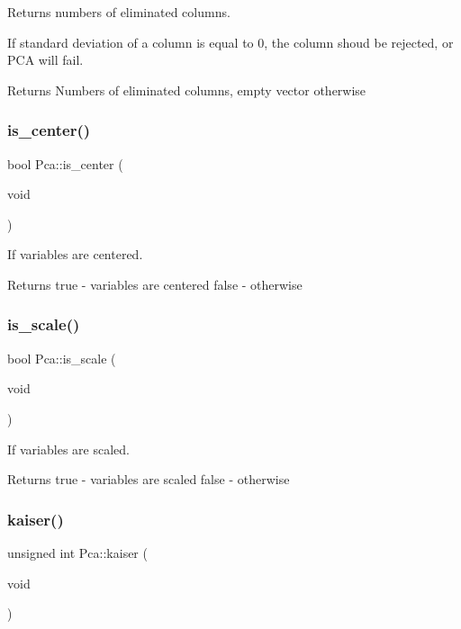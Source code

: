 Returns numbers of eliminated columns. 

If standard deviation of a column is equal to 0, the column shoud be rejected, or P\+CA will fail. \begin{DoxyReturn}{Returns}
Numbers of eliminated columns, empty vector otherwise 
\end{DoxyReturn}
\hypertarget{classPca_a756656415dc43a2a68f4394f719351b2}{}\label{classPca_a756656415dc43a2a68f4394f719351b2} 
\subsubsection{\texorpdfstring{is\+\_\+center()}{is\_center()}}
{\footnotesize\ttfamily bool Pca\+::is\+\_\+center (\begin{DoxyParamCaption}\item[{void}]{ }\end{DoxyParamCaption})}



If variables are centered. 

\begin{DoxyReturn}{Returns}
true -\/ variables are centered false -\/ otherwise 
\end{DoxyReturn}
\hypertarget{classPca_acf41e5dccf22ba87069b3eb1bc586307}{}\label{classPca_acf41e5dccf22ba87069b3eb1bc586307} 
\subsubsection{\texorpdfstring{is\+\_\+scale()}{is\_scale()}}
{\footnotesize\ttfamily bool Pca\+::is\+\_\+scale (\begin{DoxyParamCaption}\item[{void}]{ }\end{DoxyParamCaption})}



If variables are scaled. 

\begin{DoxyReturn}{Returns}
true -\/ variables are scaled false -\/ otherwise 
\end{DoxyReturn}
\hypertarget{classPca_a6c1fbe858a4cde8aa34cab8c19c84941}{}\label{classPca_a6c1fbe858a4cde8aa34cab8c19c84941} 
\subsubsection{\texorpdfstring{kaiser()}{kaiser()}}
{\footnotesize\ttfamily unsigned int Pca\+::kaiser (\begin{DoxyParamCaption}\item[{void}]{ }\end{DoxyParamCaption})}




